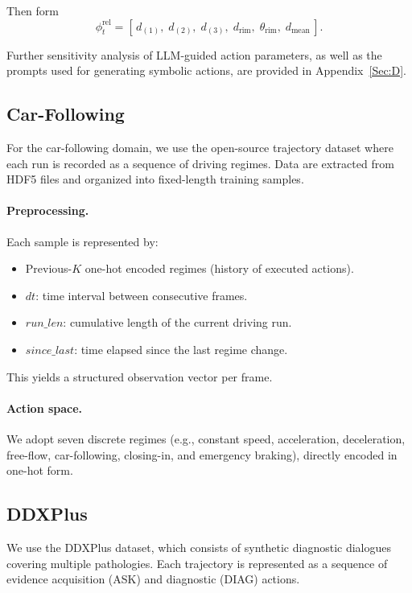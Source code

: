 \documentclass{article} %
\begin{document}
Then form
\[
\phi_t^{\text{rel}} = [\,d_{(1)},\; d_{(2)},\; d_{(3)},\; d_{\text{rim}},\; \theta_{\text{rim}},\; d_{\text{mean}}\,].
\]

Further sensitivity analysis of LLM-guided action parameters, as well as the prompts used for generating symbolic actions, are provided in Appendix~\ref{Sec:D}.

\subsection{Car-Following}
\label{Sec:B3}

For the car-following domain, we use the open-source trajectory dataset where each run is recorded as a sequence of driving regimes. Data are extracted from HDF5 files and organized into fixed-length training samples.

\paragraph{Preprocessing.}
Each sample is represented by:
\begin{itemize}
  \item Previous-$K$ one-hot encoded regimes (history of executed actions).
  \item $dt$: time interval between consecutive frames.
  \item $run\_len$: cumulative length of the current driving run.
  \item $since\_last$: time elapsed since the last regime change.
\end{itemize}
This yields a structured observation vector per frame.

\paragraph{Action space.}
We adopt seven discrete regimes (e.g., constant speed, acceleration, deceleration, free-flow, car-following, closing-in, and emergency braking), directly encoded in one-hot form.

\subsection{DDXPlus}
\label{Sec:B4}

We use the DDXPlus dataset, which consists of synthetic diagnostic dialogues covering multiple pathologies. Each trajectory is represented as a sequence of evidence acquisition (ASK) and diagnostic (DIAG) actions.
\end{document}
